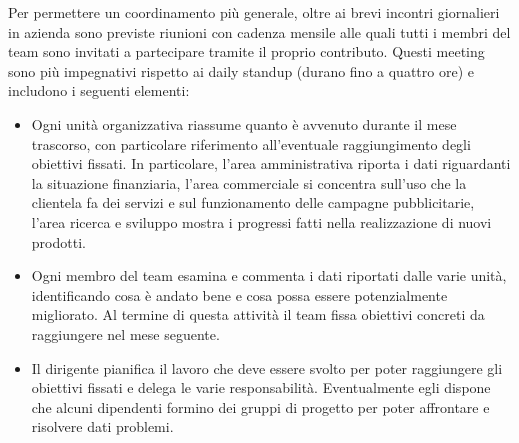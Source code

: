 				Per permettere un coordinamento più generale, oltre ai brevi incontri giornalieri in azienda sono previste riunioni
				con cadenza mensile alle quali tutti i membri del team sono invitati a partecipare tramite il proprio contributo.
				Questi meeting sono più impegnativi rispetto ai daily standup (durano fino a quattro ore) e includono i seguenti
				elementi:
				\begin{itemize}
					\item Ogni unità organizzativa riassume quanto è avvenuto durante il mese trascorso, con particolare
					riferimento all'eventuale raggiungimento degli obiettivi fissati. In particolare, l'area amministrativa
					riporta i dati riguardanti la situazione finanziaria, l'area commerciale si concentra sull'uso che la
					clientela fa dei servizi e sul funzionamento delle campagne pubblicitarie, l'area ricerca e sviluppo mostra
					i progressi fatti nella realizzazione di nuovi prodotti.
					\item Ogni membro del team esamina e commenta i dati riportati dalle varie unità, identificando cosa è andato
					bene e cosa possa essere potenzialmente migliorato. Al termine di questa attività il team fissa obiettivi
					concreti da raggiungere nel mese seguente.
					\item Il dirigente pianifica il lavoro che deve essere svolto per poter raggiungere gli obiettivi fissati e
					delega le varie responsabilità. Eventualmente egli dispone che alcuni dipendenti formino dei gruppi di
					progetto per poter affrontare e risolvere dati problemi.
				\end{itemize}
